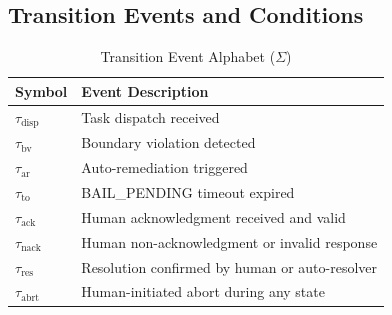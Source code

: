 \subsection{Transition Events and Conditions}

\begin{table}[h]
  \centering
  \caption{Transition Event Alphabet ($\Sigma$)}
  \label{tab:events}
  \begin{tabular}{ll}
    \toprule
    \textbf{Symbol} & \textbf{Event Description} \\
    \midrule
    $\tau_{\text{disp}}$   & Task dispatch received \\
    $\tau_{\text{bv}}$     & Boundary violation detected \\
    $\tau_{\text{ar}}$     & Auto-remediation triggered \\
    $\tau_{\text{to}}$     & BAIL\_PENDING timeout expired \\
    $\tau_{\text{ack}}$    & Human acknowledgment received and valid \\
    $\tau_{\text{nack}}$   & Human non-acknowledgment or invalid response \\
    $\tau_{\text{res}}$    & Resolution confirmed by human or auto-resolver \\
    $\tau_{\text{abrt}}$   & Human-initiated abort during any state \\
    \bottomrule
  \end{tabular}
\end{table}

